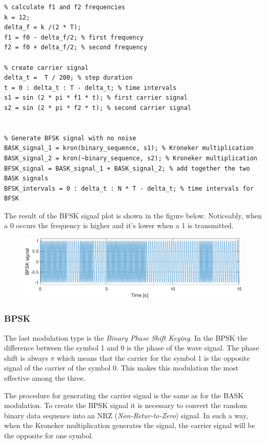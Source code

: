 \begin{lstlisting}
% calculate f1 and f2 frequencies
k = 12;
delta_f = k /(2 * T); 
f1 = f0 - delta_f/2; % first frequency
f2 = f0 + delta_f/2; % second frequency

% create carrier signal
delta_t =  T / 200; % step duration
t = 0 : delta_t : T - delta_t; % time intervals
s1 = sin (2 * pi * f1 * t); % first carrier signal
s2 = sin (2 * pi * f2 * t); % second carrier signal


% Generate BFSK signal with no noise
BASK_signal_1 = kron(binary_sequence, s1); % Kroneker multiplication
BASK_signal_2 = kron(~binary_sequence, s2); % Kroneker multiplication
BFSK_signal = BASK_signal_1 + BASK_signal_2; % add together the two BASK signals
BFSK_intervals = 0 : delta_t : N * T - delta_t; % time intervals for BFSK
\end{lstlisting}

\noindent The result of the BFSK signal plot is shown in the figure below. Noticeably, when a 0 occurs the frequency is higher and it's lower when a 1 is transmitted.

\begin{figure}[!h]
    \centering
    \includegraphics[width = .7\textwidth]{lab-3/imgs/task2_BFSK.png}
\end{figure}
\vspace*{-15px}

\subsubsection*{BPSK}
The last modulation type is the \textsl{Binary Phase Shift Keying}. In the BPSK the difference between the symbol 1 and 0 is the phase of the wave signal. The phase shift is always $\pi$ which means that the carrier for the symbol 1 is the opposite signal of the carrier of the symbol 0. This makes this modulation the most effective among the three.

The procedure for generating the carrier signal is the same as for the BASK modulation. To create the BPSK signal it is necessary to convert the random binary data sequence into an NRZ (\textsl{Non-Retur-to-Zero}) signal. In such a way, when the Kroneker multiplication generates the signal, the carrier signal will be the opposite for one symbol. 

